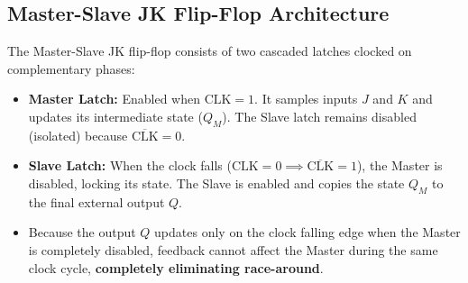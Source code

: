 \documentclass[12pt,a4paper]{article}
\begin{document}
\subsection{Master-Slave JK Flip-Flop Architecture}
The Master-Slave JK flip-flop consists of two cascaded latches clocked on complementary phases:
\begin{itemize}[leftmargin=*, itemsep=3pt]
  \item \textbf{Master Latch:} Enabled when $\text{CLK} = 1$. It samples inputs $J$ and $K$ and updates its intermediate state ($Q_M$). The Slave latch remains disabled (isolated) because $\overline{\text{CLK}} = 0$.
  \item \textbf{Slave Latch:} When the clock falls ($\text{CLK} = 0 \implies \overline{\text{CLK}} = 1$), the Master is disabled, locking its state. The Slave is enabled and copies the state $Q_M$ to the final external output $Q$.
  \item Because the output $Q$ updates only on the clock falling edge when the Master is completely disabled, feedback cannot affect the Master during the same clock cycle, \textbf{completely eliminating race-around}.
\end{itemize}
\end{document}
